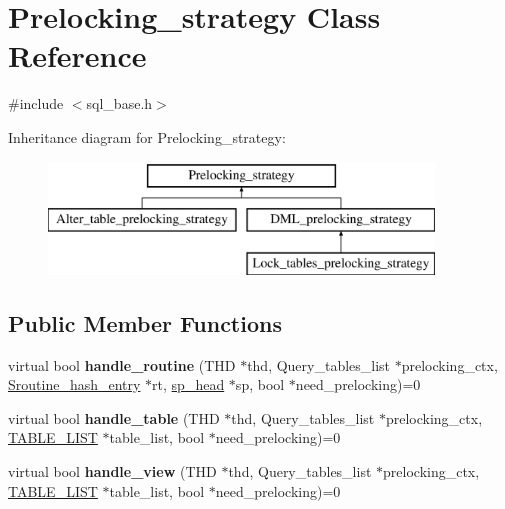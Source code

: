 \hypertarget{classPrelocking__strategy}{}\section{Prelocking\+\_\+strategy Class Reference}
\label{classPrelocking__strategy}


{\ttfamily \#include $<$sql\+\_\+base.\+h$>$}

Inheritance diagram for Prelocking\+\_\+strategy\+:\begin{figure}[H]
\begin{center}
\leavevmode
\includegraphics[height=3.000000cm]{classPrelocking__strategy}
\end{center}
\end{figure}
\subsection*{Public Member Functions}
\begin{DoxyCompactItemize}
\item 
\mbox{\label{classPrelocking__strategy_aff816c4dc712af6528b676cede95c6c2}} 
virtual bool {\bfseries handle\+\_\+routine} (T\+HD $\ast$thd, Query\+\_\+tables\+\_\+list $\ast$prelocking\+\_\+ctx, \mbox{\hyperlink{classSroutine__hash__entry}{Sroutine\+\_\+hash\+\_\+entry}} $\ast$rt, \mbox{\hyperlink{classsp__head}{sp\+\_\+head}} $\ast$sp, bool $\ast$need\+\_\+prelocking)=0
\item 
\mbox{\label{classPrelocking__strategy_afbfc79c3385af9040226acc73920c4e7}} 
virtual bool {\bfseries handle\+\_\+table} (T\+HD $\ast$thd, Query\+\_\+tables\+\_\+list $\ast$prelocking\+\_\+ctx, \mbox{\hyperlink{structTABLE__LIST}{T\+A\+B\+L\+E\+\_\+\+L\+I\+ST}} $\ast$table\+\_\+list, bool $\ast$need\+\_\+prelocking)=0
\item 
\mbox{\label{classPrelocking__strategy_a6d65358a6a1c9d4d736f828e1ed9649e}} 
virtual bool {\bfseries handle\+\_\+view} (T\+HD $\ast$thd, Query\+\_\+tables\+\_\+list $\ast$prelocking\+\_\+ctx, \mbox{\hyperlink{structTABLE__LIST}{T\+A\+B\+L\+E\+\_\+\+L\+I\+ST}} $\ast$table\+\_\+list, bool $\ast$need\+\_\+prelocking)=0
\end{DoxyCompactItemize}


